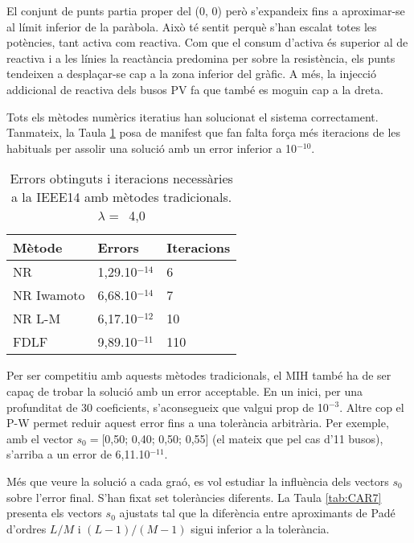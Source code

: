El conjunt de punts partia proper del (0, 0) però s'expandeix fins a aproximar-se al límit inferior de la paràbola. Això té sentit perquè s'han escalat totes les potències, tant activa com reactiva. Com que el consum d'activa és superior al de reactiva i a les línies la reactància predomina per sobre la resistència, els punts tendeixen a desplaçar-se cap a la zona inferior del gràfic. A més, la injecció addicional de reactiva dels busos PV fa que també es moguin cap a la dreta.

Tots els mètodes numèrics iteratius han solucionat el sistema correctament. Tanmateix, la Taula \ref{tab:CAR6} posa de manifest que fan falta força més iteracions de les habituals per assolir una solució amb un error inferior a 10$^{-10}$. 

\begin{table}[!htb]
  \begin{center}
  \begin{tabular}{lll}
  \hline
  Mètode & Errors & Iteracions\\
  \hline
  \hline
  NR & 1,29.10$^{-14}$ & 6\\ 
  NR Iwamoto & 6,68.10$^{-14}$ & 7\\
  NR L-M & 6,17.10$^{-12}$ & 10\\ 
  FDLF & 9,89.10$^{-11}$ & 110\\
  \hline 
  \end{tabular}
  \caption{Errors obtinguts i iteracions necessàries a la IEEE14 amb mètodes tradicionals. $\lambda=$\ 4,0}
  \label{tab:CAR6}
  \end{center}
\end{table}

Per ser competitiu amb aquests mètodes tradicionals, el MIH també ha de ser capaç de trobar la solució amb un error acceptable. En un inici, per una profunditat de 30 coeficients, s'aconsegueix que valgui prop de 10$^{-3}$. Altre cop el P-W permet reduir aquest error fins a una tolerància arbitrària. Per exemple, amb el vector $s_0=$[0,50; 0,40; 0,50; 0,55] (el mateix que pel cas d'11 busos), s'arriba a un error de 6,11.10$^{-11}$. 

Més que veure la solució a cada graó, es vol estudiar la influència dels vectors $s_0$ sobre l'error final. S'han fixat set toleràncies diferents. La Taula \ref{tab:CAR7} presenta els vectors $s_0$ ajustats tal que la diferència entre aproximants de Padé d'ordres $L/M$ i $(L-1)/(M-1)$ sigui inferior a la tolerància.

